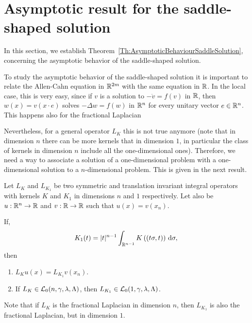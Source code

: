 \section{Asymptotic result for the saddle-shaped solution}
\label{Sec:Asymptotic}

In this section, we establish Theorem~\ref{Th:AsymptoticBehaviourSaddleSolution}, concerning the asymptotic behavior of the saddle-shaped solution. 



To study the asymptotic behavior of the saddle-shaped solution it is important to relate the Allen-Cahn equation in $\mathbb{R}^{2m}$ with the same equation in $\mathbb{R}$. In the local case, this is very easy, since if $v$ is a solution to $-\ddot{v} = f(v)$ in $\mathbb{R}$,  then $w(x) = v(x\cdot e)$ solves $-\Delta w = f(w)$ in $\mathbb{R}^n$ for every unitary vector $e\in \mathbb{R}^n$. This happens also for the fractional Laplacian

Nevertheless, for a general operator $L_K$ this is not true anymore (note that in dimension $n$ there can be more kernels that in dimension $1$, in particular the class of kernels in dimension $n$ include all the one-dimensional ones). Therefore, we need a way to associate a solution of a one-dimensional problem with a one-dimensional solution to a $n$-dimensional problem. This is given in the next result.



\begin{proposition}
	\label{Prop:KernelsDimension}
	Let $L_K $ and $L_{K_1}$ be two symmetric and translation invariant integral operators with kernels $K$ and $K_1$ in dimensions $n$ and $1$ respectively. Let also be $u:\mathbb{R}^n\to\mathbb{R}$ and $v:\mathbb{R}\to\mathbb{R}$ such that $u(x) = v(x_n)$.
	
	If,
	$$ K_1(t) = |t|^{n-1} \int_{\mathbb{R}^{n-1}} K\left((t\sigma,t)\right) \,\mathrm{d} \sigma, $$
	then
	\begin{enumerate}[label=(\roman{*})]
		\item $L_K u(x) = L_{K_1} v(x_n)$.
		\item If $L_K \in \mathcal{L}_0 (n,\gamma,\lambda,\Lambda)$, then   $L_{K_1} \in \mathcal{L}_0 (1,\gamma,\lambda,\Lambda)$.
	\end{enumerate}
\end{proposition}

Note that if $L_K $ is the fractional Laplacian in dimension $n$, then $L_{K_1}$ is also the fractional Laplacian, but in dimension $1$.

